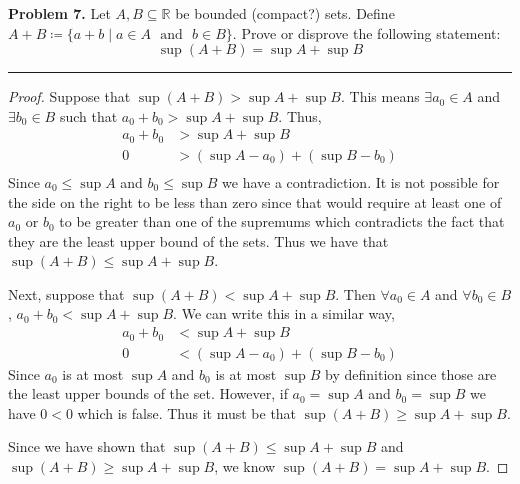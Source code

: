 \documentclass[leqno]{article}
\theoremstyle{nonumberplain}
\newtheorem{proof}{Proof}
\begin{document}
\pagebreak




\noindent\textbf{Problem 7.} Let $A, B \subseteq \mathbb{R}$ be bounded (compact?) sets. Define $A + B \coloneqq \{a+b \mid a\in A \textrm{~ and ~} b\in B\}$. Prove or disprove the following statement:
\[
\sup(A+B)=\sup A + \sup B
\]

\noindent\rule[0.5ex]{\linewidth}{1pt}

\begin{proof}
Suppose that $\sup (A+B) > \sup A + \sup B$.  This means $\exists a_0 \in A$ and $\exists b_0 \in B$ such that $a_0 + b_0 > \sup A + \sup B$. Thus,
\begin{align*}
a_0 + b_0 &> \sup A + \sup B\\
0 &> (\sup A - a_0) + (\sup B - b_0)\\
\end{align*}
Since $a_0 \leq \sup A$ and $b_0 \leq \sup B$ we have a contradiction.  It is not possible for the side on the right to be less than zero since that would require at least one of $a_0$ or $b_0$ to be greater than one of the supremums which contradicts the fact that they are the least upper bound of the sets.  Thus we have that $\sup (A+B) \leq \sup A + \sup B$.

Next, suppose that $\sup(A+B) < \sup A + \sup B$.  Then $\forall a_0 \in A$ and $\forall b_0 \in B$, $a_0 + b_0 < \sup A + \sup B$.  We can write this in a similar way,
\begin{align*}
a_0 + b_0 &< \sup A + \sup B\\
0 &< (\sup A - a_0) + (\sup B - b_0)
\end{align*}  
Since $a_0$ is at most $\sup A$ and $b_0$ is at most $\sup B$ by definition since those are the least upper bounds of the set.  However, if $a_0 =\sup A$ and $b_0 = \sup B$ we have $0<0$ which is false.  Thus it must be that $\sup (A+B) \geq \sup A + \sup B$.

Since we have shown that $\sup (A+B) \leq \sup A + \sup B$ and $\sup (A+B) \geq \sup A + \sup B$, we know $\sup (A+B) = \sup A + \sup B$.
\end{proof}
\end{document}
